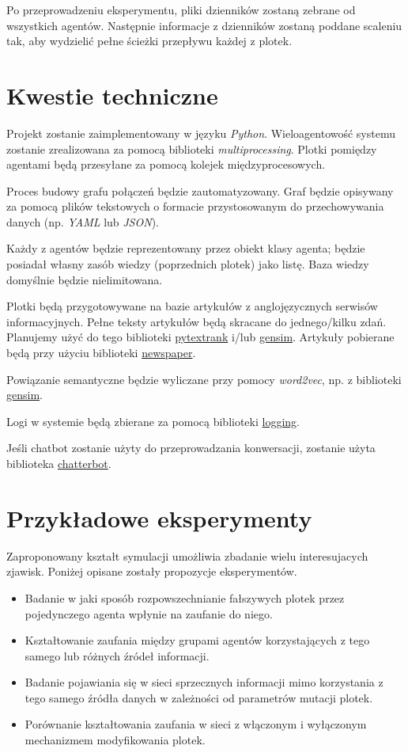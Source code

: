 \documentclass{article}
\begin{document}
	Po przeprowadzeniu eksperymentu, pliki dzienników zostaną zebrane od wszystkich agentów. Następnie informacje z dzienników zostaną poddane scaleniu tak, aby wydzielić pełne ścieżki przepływu każdej z plotek.
	\section{Kwestie techniczne}
	Projekt zostanie zaimplementowany w języku \textit{Python}. Wieloagentowość systemu zostanie zrealizowana za pomocą biblioteki \textit{multiprocessing}. Plotki pomiędzy agentami będą przesyłane za pomocą kolejek międzyprocesowych.
	
	Proces budowy grafu połączeń będzie zautomatyzowany. Graf będzie opisywany za pomocą plików tekstowych o formacie przystosowanym do przechowywania danych (np. \textit{YAML} lub \textit{JSON}).
	
	Każdy z agentów będzie reprezentowany przez obiekt klasy agenta; będzie posiadał własny zasób wiedzy (poprzednich plotek) jako listę. Baza wiedzy domyślnie będzie nielimitowana.
	
	Plotki będą przygotowywane na bazie artykułów z anglojęzycznych serwisów informacyjnych. Pełne teksty artykułów będą skracane do jednego/kilku zdań. Planujemy użyć do tego biblioteki \href{https://github.com/DerwenAI/pytextrank}{pytextrank} i/lub \href{https://pypi.org/project/gensim/}{gensim}. Artykuły pobierane będą przy użyciu biblioteki \href{https://newspaper.readthedocs.io/}{newspaper}.
	
	Powiązanie semantyczne będzie wyliczane przy pomocy \textit{word2vec}, np. z biblioteki \href{https://pypi.org/project/gensim/}{gensim}.
	
	Logi w systemie będą zbierane za pomocą biblioteki \href{https://docs.python.org/3/library/logging.html#module-logging}{logging}.
	
	Jeśli chatbot zostanie użyty do przeprowadzania konwersacji, zostanie użyta biblioteka \href{https://chatterbot.readthedocs.io/en/stable/}{chatterbot}.
	
	\section{Przykładowe eksperymenty}
	Zaproponowany kształt symulacji umożliwia zbadanie wielu interesujacych zjawisk. Poniżej opisane zostały propozycje eksperymentów.
	\begin{itemize}
	\item Badanie w jaki sposób rozpowszechnianie fałszywych plotek przez pojedynczego agenta wpłynie na zaufanie do niego.
	\item Kształtowanie zaufania między grupami agentów korzystających z tego samego lub różnych źródeł informacji.
	\item Badanie pojawiania się w sieci sprzecznych informacji mimo korzystania z tego samego źródła danych w zależności od parametrów mutacji plotek.
	\item Porównanie kształtowania zaufania w sieci z włączonym i wyłączonym mechanizmem modyfikowania plotek.
	\end{itemize}
\end{document}
